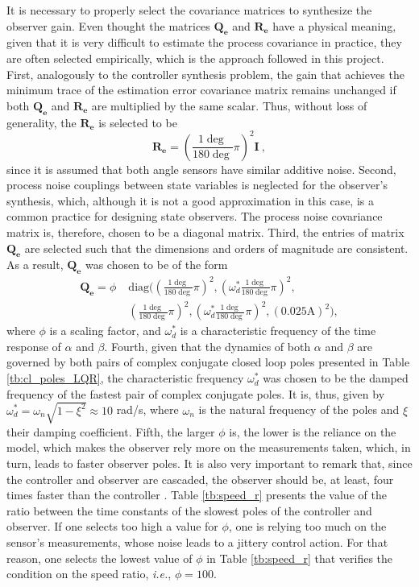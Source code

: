 \documentclass[letterpaper, 10 pt, conference]{ieeeconf}
\begin{document}
It is necessary to properly select the covariance matrices to synthesize the observer gain. Even thought the matrices $\mathbf{Q_e}$ and $\mathbf{R_e}$ have a physical meaning, given that it is very difficult to estimate the process covariance in practice, they are often selected empirically, which is the approach followed in this project. First, analogously to the controller synthesis problem, the gain that achieves the minimum trace of the estimation error covariance matrix remains unchanged if both $\mathbf{Q_e}$ and $\mathbf{R_e}$ are multiplied by the same scalar. Thus, without loss of generality, the  $\mathbf{R_e}$ is selected to be
\begin{equation*}
    \mathbf{R_e} = \left(\frac{1\deg}{180\deg}\pi\right)^2\mathbf{I}\:,
\end{equation*}
since it is assumed that both angle sensors have similar additive noise. Second, process noise couplings between state variables is neglected for the observer's synthesis, which, although it is not a good approximation in this case, is a common practice for designing state observers. The process noise covariance matrix is, therefore, chosen to be a diagonal matrix. Third, the entries of matrix $\mathbf{Q_e}$ are selected such that the dimensions and orders of magnitude are consistent. As a result, $\mathbf{Q_e}$ was chosen to be of the form
\begin{equation*}
\begin{split}
    \mathbf{Q_e}\!=\! \phi\; &\mathrm{diag}({\left(\frac{1\deg}{180 \deg} \pi\right)^2}\!\!,{\left(\omega_d^*\frac{1\deg}{180 \deg} \pi\right)^2}\!\!,\\
    &{\left(\frac{1\deg}{180 \deg} \pi\right)^2}\!\!,{\left(\omega_d^*\frac{1\deg}{180 \deg} \pi\right)^2}\!\!,(0.025 \mathrm{A})^2\!),
    \end{split}
\end{equation*}
where $\phi$ is a scaling factor, and $\omega_d^*$ is a characteristic frequency of the time response of $\alpha$ and $\beta$. Fourth, given that the dynamics of both $\alpha$ and $\beta$ are governed by both pairs of complex conjugate closed loop poles presented in Table \ref{tb:cl_poles_LQR}, the characteristic frequency $\omega_d^*$ was chosen to be the damped frequency of the fastest pair of complex conjugate poles. It is, thus, given by $\omega_d^* = \omega_n \sqrt{1-\xi^2} \approx 10$ rad/s, where $\omega_n$ is the natural frequency of the poles and $\xi$ their damping coefficient. Fifth, the larger $\phi$ is, the lower is the reliance on the model, which makes the observer rely more on the measurements taken, which, in turn, leads to faster observer poles. It is also very important to remark that, since the controller and observer are cascaded, the observer should be, at least, four times faster than the controller \cite{J.M.Lemos_1_2019}. Table \ref{tb:speed_r} presents the value of the ratio between the time constants of the slowest poles of the controller and observer. If one selects too high a value for $\phi$, one is relying too much on the sensor's measurements, whose noise leads to a jittery control action. For that reason, one selects the lowest value of $\phi$ in Table \ref{tb:speed_r} that verifies the condition on the speed ratio, \textit{i.e.}, $\phi = 100$.
\end{document}
